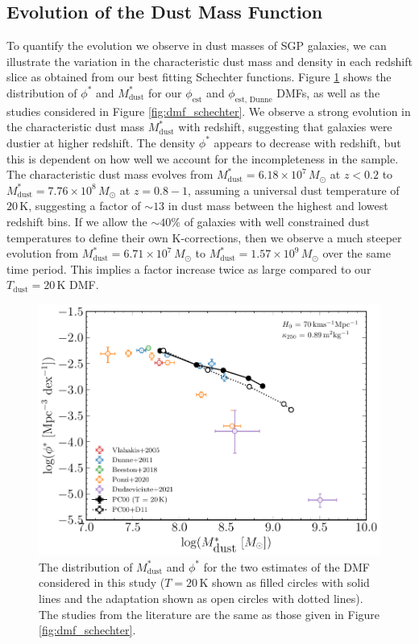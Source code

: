 \subsection{Evolution of the Dust Mass Function}

To quantify the evolution we observe in dust masses of SGP galaxies, we can illustrate the variation in the characteristic dust mass and density in each redshift slice as obtained from our best fitting Schechter functions. Figure \ref{fig:dmf_schechter_parameters} shows the distribution of $\phi^*$ and $M_{\textrm{dust}}^*$ for our $\phi_{\textrm{est}}$ and $\phi_{\textrm{est, Dunne}}$ DMFs, as well as the studies considered in Figure \ref{fig:dmf_schechter}. We observe a strong evolution in the characteristic dust mass $M_{\textrm{dust}}^*$ with redshift, suggesting that galaxies were dustier at higher redshift. The density $\phi^*$ appears to decrease with redshift, but this is dependent on how well we account for the incompleteness in the sample. The characteristic dust mass evolves from $M_{\textrm{dust}}^* = 6.18\times10^7\,M_{\odot}$ at $z < 0.2$ to $M_{\textrm{dust}}^* = 7.76\times10^8\,M_{\odot}$ at $z = 0.8 - 1$, assuming a universal dust temperature of $20\,$K, suggesting a factor of $\sim 13$ in dust mass between the highest and lowest redshift bins. If we allow the $\sim 40\%$ of galaxies with well constrained dust temperatures to define their own K-corrections, then we observe a much steeper evolution from $M_{\textrm{dust}}^* = 6.71\times10^7\,M_{\odot}$ to $M_{\textrm{dust}}^* = 1.57\times10^9\,M_{\odot}$ over the same time period. This implies a factor increase twice as large compared to our $T_{\textrm{dust}} = 20\,$K DMF.

\begin{figure}
	\centering
	\includegraphics[width=0.8\columnwidth]{Figures/dmf_schechter_parameters.pdf}
	\caption[Distribution of $M_{\textrm{dust}}^*$ and $\phi^*$ from best fitting Schechter functions]{The distribution of $M_{\textrm{dust}}^*$ and $\phi^*$ for the two estimates of the DMF considered in this study ($T = 20\,$K shown as filled circles with solid lines and the \citealt{Dunne_2011} adaptation shown as open circles with dotted lines). The studies from the literature are the same as those given in Figure \ref{fig:dmf_schechter}.}
	\label{fig:dmf_schechter_parameters}
\end{figure}

